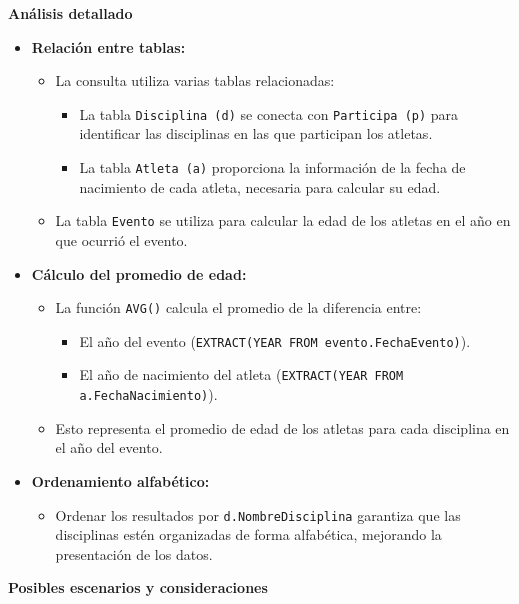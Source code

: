 \textbf{Análisis detallado}

\begin{itemize} \item \textbf{Relación entre tablas:} \begin{itemize} \item La consulta utiliza varias tablas relacionadas: \begin{itemize} \item La tabla \texttt{Disciplina (d)} se conecta con \texttt{Participa (p)} para identificar las disciplinas en las que participan los atletas. \item La tabla \texttt{Atleta (a)} proporciona la información de la fecha de nacimiento de cada atleta, necesaria para calcular su edad. \end{itemize} \item La tabla \texttt{Evento} se utiliza para calcular la edad de los atletas en el año en que ocurrió el evento. \end{itemize}
	
	\item \textbf{Cálculo del promedio de edad:} \begin{itemize} \item La función \texttt{AVG()} calcula el promedio de la diferencia entre: \begin{itemize} \item El año del evento (\texttt{EXTRACT(YEAR FROM evento.FechaEvento)}). \item El año de nacimiento del atleta (\texttt{EXTRACT(YEAR FROM a.FechaNacimiento)}). \end{itemize} \item Esto representa el promedio de edad de los atletas para cada disciplina en el año del evento. \end{itemize}
	
	\item \textbf{Ordenamiento alfabético:} \begin{itemize} \item Ordenar los resultados por \texttt{d.NombreDisciplina} garantiza que las disciplinas estén organizadas de forma alfabética, mejorando la presentación de los datos. \end{itemize} \end{itemize}

\textbf{Posibles escenarios y consideraciones}

